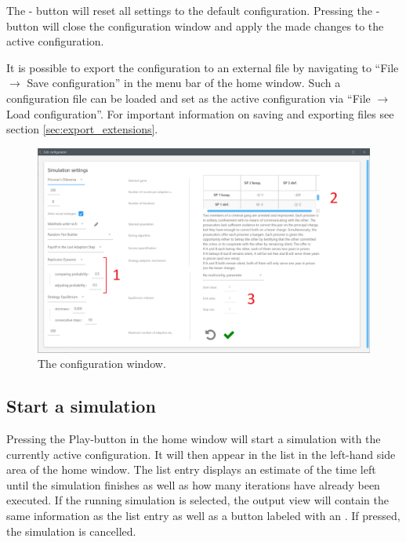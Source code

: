 \documentclass[parskip=full,11pt]{scrartcl}
\newlength\myheight
\newlength\mydepth
\newcommand*\inlinegraphics[1]{%
  \settototalheight\myheight{Xygp}%
  \settodepth\mydepth{Xygp}%
  \raisebox{-1.8\mydepth}{\texttt{[image: \#1]}}%
}
\begin{document}
The  \inlinegraphics{img_manual/rotate_left_button.png} - button will reset all settings to the default configuration. Pressing the  \inlinegraphics{img_manual/check_button.png} - button will close the configuration window and apply the made changes to the active configuration.

It is possible to export the configuration to an external file by navigating to \enquote{File \(\rightarrow\) Save configuration} in the menu bar of the home window. Such a configuration file can be loaded and set as the active configuration via \enquote{File \(\rightarrow\) Load configuration}. For important information on saving and exporting files see section \ref{sec:export_extensions}.

\begin{figure}
	\centering
	\includegraphics[width=\linewidth]{img_manual/config_window.png}
	\caption{The configuration window.}
	\label{fig:config_window}
\end{figure}

\subsection{Start a simulation}
Pressing the Play-button in the home window will start a simulation with the currently active configuration. It will then appear in the list in the left-hand side area of the home window. The list entry displays an estimate of the time left until the simulation finishes as well as how many iterations have already been executed. If the running simulation is selected, the output view will contain the same information as the list entry as well as a button labeled with an  \inlinegraphics{img_manual/x_button.png}. If pressed, the simulation is cancelled.
\end{document}
